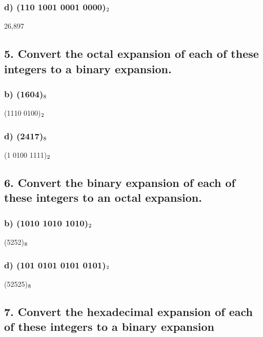 \documentclass[11pt, oneside]{article} %
\numberwithin{equation}{section} %
\numberwithin{figure}{section} %
\numberwithin{table}{section} %
\begin{document}
\subsubsection{d) (110 1001 0001 0000)$\textsubscript{2}$}
26,897


\subsection{5. Convert the octal expansion of each of these integers to a
binary expansion.}
\subsubsection{b) (1604)$\textsubscript{8}$}
(1110 0100)$\textsubscript{2}$
\subsubsection{d) (2417)$\textsubscript{8}$}
(1 0100 1111)$\textsubscript{2}$

\subsection{6. Convert the binary expansion of each of these integers to an octal expansion.}
\subsubsection{b) (1010 1010 1010)$\textsubscript{2}$}
(5252)$\textsubscript{8}$
\subsubsection{d) (101 0101 0101 0101)$\textsubscript{2}$}
(52525)$\textsubscript{8}$


\subsection{7. Convert the hexadecimal expansion of each of these integers to a binary expansion}
\end{document}
